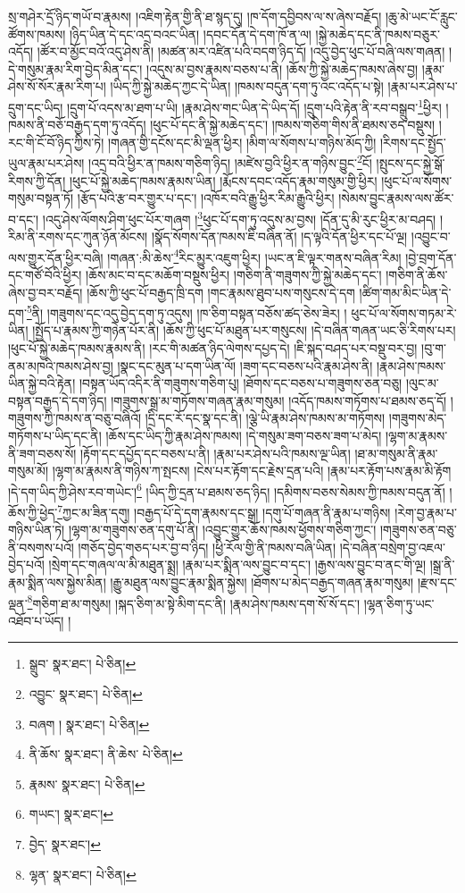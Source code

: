 སྲ་གཤེར་དྲོ་ཉིད་གཡོ་བ་རྣམས། །འཇིག་རྟེན་གྱི་ནི་ཐ་སྙད་དུ། །ཁ་དོག་དབྱིབས་ལ་ས་ཞེས་བརྗོད། །ཆུ་མེ་ཡང་ངོ་རླུང་ཚོགས་ཁམས། །ཉིད་ཡིན་དེ་དང་འདྲ་བའང་ཡིན། །དབང་དོན་དེ་དག་ཁོ་ན་ལ། །སྐྱེ་མཆེད་དང་ནི་ཁམས་བཅུར་འདོད། །ཚོར་བ་མྱོང་བའོ་འདུ་ཤེས་ནི། །མཚན་མར་འཛིན་པའི་བདག་ཉིད་དོ། །འདུ་བྱེད་ཕུང་པོ་བཞི་ལས་གཞན། །དེ་གསུམ་རྣམ་རིག་བྱེད་མིན་དང་། །འདུས་མ་བྱས་རྣམས་བཅས་པ་ནི། །ཆོས་ཀྱི་སྐྱེ་མཆེད་ཁམས་ཞེས་བྱ། །རྣམ་ཤེས་སོ་སོར་རྣམ་རིག་པ། །ཡིད་ཀྱི་སྐྱེ་མཆེད་ཀྱང་དེ་ཡིན། །ཁམས་བདུན་དག་ཏུ་འང་འདོད་པ་སྟེ། །རྣམ་པར་ཤེས་པ་དྲུག་དང་ཡིད། །དྲུག་པོ་འདས་མ་ཐག་པ་ཡི། །རྣམ་ཤེས་གང་ཡིན་དེ་ཡིད་དོ། །དྲུག་པའི་རྟེན་ནི་རབ་བསྒྲུབ་\footnote{སྒྲུབ་  སྣར་ཐང་།  པེ་ཅིན། }ཕྱིར། །ཁམས་ནི་བཅོ་བརྒྱད་དག་ཏུ་འདོད། །ཕུང་པོ་དང་ནི་སྐྱེ་མཆེད་དང་། །ཁམས་གཅིག་གིས་ནི་ཐམས་ཅད་བསྡུས། །རང་གི་ངོ་བོ་ཉིད་ཀྱིས་ཏེ། །གཞན་གྱི་དངོས་དང་མི་ལྡན་ཕྱིར། །མིག་ལ་སོགས་པ་གཉིས་མོད་ཀྱི། །རིགས་དང་སྤྱོད་ཡུལ་རྣམ་པར་ཤེས། །འདྲ་བའི་ཕྱིར་ན་ཁམས་གཅིག་ཉིད། །མཛེས་བྱའི་ཕྱིར་ན་གཉིས་བྱུང་\footnote{འབྱུང་  སྣར་ཐང་།  པེ་ཅིན། }ངོ། །སྤུངས་དང་སྐྱེ་སྒོ་རིགས་ཀྱི་དོན། །ཕུང་པོ་སྐྱེ་མཆེད་ཁམས་རྣམས་ཡིན། །རྨོངས་དབང་འདོད་རྣམ་གསུམ་གྱི་ཕྱིར། །ཕུང་པོ་ལ་སོགས་གསུམ་བསྟན་ཏོ། །རྩོད་པའི་རྩ་བར་གྱུར་པ་དང་། །འཁོར་བའི་རྒྱུ་ཕྱིར་རིམ་རྒྱུའི་ཕྱིར། །སེམས་བྱུང་རྣམས་ལས་ཚོར་བ་དང་། །འདུ་ཤེས་ལོགས་ཤིག་ཕུང་པོར་གཞག །\footnote{བཞག །  སྣར་ཐང་།  པེ་ཅིན། }ཕུང་པོ་དག་ཏུ་འདུས་མ་བྱས། །དོན་དུ་མི་རུང་ཕྱིར་མ་བཤད། །རིམ་ནི་རགས་དང་ཀུན་ཉོན་མོངས། །སྣོད་སོགས་དོན་ཁམས་ཇི་བཞིན་ནོ། །ད་ལྟའི་དོན་ཕྱིར་དང་པོ་ལྔ། །འབྱུང་བ་ལས་གྱུར་དོན་ཕྱིར་བཞི། །གཞན་:མི་ཆེས་\footnote{ནི་ཆོས་  སྣར་ཐང་། ནི་ཆེས་  པེ་ཅིན། }རིང་མྱུར་འཇུག་ཕྱིར། །ཡང་ན་ཇི་ལྟར་གནས་བཞིན་རིམ། །བྱེ་བྲག་དོན་དང་གཙོ་བོའི་ཕྱིར། །ཆོས་མང་བ་དང་མཆོག་བསྡུས་ཕྱིར། །གཅིག་ནི་གཟུགས་ཀྱི་སྐྱེ་མཆེད་དང་། །གཅིག་ནི་ཆོས་ཞེས་བྱ་བར་བརྗོད། །ཆོས་ཀྱི་ཕུང་པོ་བརྒྱད་ཁྲི་དག །གང་རྣམས་ཐུབ་པས་གསུངས་དེ་དག །ཚིག་གམ་མིང་ཡིན་དེ་དག་\footnote{རྣམས་  སྣར་ཐང་།  པེ་ཅིན། }ནི། །གཟུགས་དང་འདུ་བྱེད་དག་ཏུ་འདུས། །ཁ་ཅིག་བསྟན་བཅོས་ཚད་ཅེས་ཟེར། །
ཕུང་པོ་ལ་སོགས་གཏམ་རེ་ཡིན། །སྤྱོད་པ་རྣམས་ཀྱི་གཉེན་པོར་ནི། །ཆོས་ཀྱི་ཕུང་པོ་མཐུན་པར་གསུངས། །དེ་བཞིན་གཞན་ཡང་ཅི་རིགས་པར། །ཕུང་པོ་སྐྱེ་མཆེད་ཁམས་རྣམས་ནི། །རང་གི་མཚན་ཉིད་ལེགས་དཔྱད་དེ། །ཇི་སྐད་བཤད་པར་བསྡུ་བར་བྱ། །བུ་ག་ནམ་མཁའི་ཁམས་ཤེས་བྱ། །སྣང་དང་མུན་པ་དག་ཡིན་ལོ། །ཟག་དང་བཅས་པའི་རྣམ་ཤེས་ནི། །རྣམ་ཤེས་ཁམས་ཡིན་སྐྱེ་བའི་རྟེན། །བསྟན་ཡོད་འདིར་ནི་གཟུགས་གཅིག་པུ། །ཐོགས་དང་བཅས་པ་གཟུགས་ཅན་བཅུ། །ལུང་མ་བསྟན་བརྒྱད་དེ་དག་ཉིད། །གཟུགས་སྒྲ་མ་གཏོགས་གཞན་རྣམ་གསུམ། །འདོད་ཁམས་གཏོགས་པ་ཐམས་ཅད་དོ། །གཟུགས་ཀྱི་ཁམས་ན་བཅུ་བཞིའོ། །དྲི་དང་རོ་དང་སྣ་དང་ནི། །ལྕེ་ཡི་རྣམ་ཤེས་ཁམས་མ་གཏོགས། །གཟུགས་མེད་གཏོགས་པ་ཡིད་དང་ནི། །ཆོས་དང་ཡིད་ཀྱི་རྣམ་ཤེས་ཁམས། །དེ་གསུམ་ཟག་བཅས་ཟག་པ་མེད། །ལྷག་མ་རྣམས་ནི་ཟག་བཅས་སོ། །རྟོག་དང་དཔྱོད་དང་བཅས་པ་ནི། །རྣམ་པར་ཤེས་པའི་ཁམས་ལྔ་ཡིན། །ཐ་མ་གསུམ་ནི་རྣམ་གསུམ་མོ། །ལྷག་མ་རྣམས་ནི་གཉིས་ཀ་སྤངས། །ངེས་པར་རྟོག་དང་རྗེས་དྲན་པའི། །རྣམ་པར་རྟོག་པས་རྣམ་མི་རྟོག །དེ་དག་ཡིད་ཀྱི་ཤེས་རབ་གཡེང་།\footnote{གཡང་།  སྣར་ཐང་། } །ཡིད་ཀྱི་དྲན་པ་ཐམས་ཅད་ཉིད། །དམིགས་བཅས་སེམས་ཀྱི་ཁམས་བདུན་ནོ། །ཆོས་ཀྱི་ཕྱེད་\footnote{བྱེད་  སྣར་ཐང་། }ཀྱང་མ་ཟིན་དགུ། །བརྒྱད་པོ་དེ་དག་རྣམས་དང་སྒྲ། །དགུ་པོ་གཞན་ནི་རྣམ་པ་གཉིས། །རེག་བྱ་རྣམ་པ་གཉིས་ཡིན་ཏེ། །ལྷག་མ་གཟུགས་ཅན་དགུ་པོ་ནི། །འབྱུང་གྱུར་ཆོས་ཁམས་ཕྱོགས་གཅིག་ཀྱང་། །གཟུགས་ཅན་བཅུ་ནི་བསགས་པའོ། །གཅོད་བྱེད་གཅད་པར་བྱ་བ་ཉིད། །ཕྱི་རོལ་གྱི་ནི་ཁམས་བཞི་ཡིན། །དེ་བཞིན་བསྲེག་བྱ་འཇལ་བྱེད་པའོ། །སྲེག་དང་གཞལ་ལ་མི་མཐུན་སྨྲ། །རྣམ་པར་སྨིན་ལས་བྱུང་བ་དང་། །རྒྱས་ལས་བྱུང་བ་ནང་གི་ལྔ། །སྒྲ་ནི་རྣམ་སྨིན་ལས་སྐྱེས་མིན། །རྒྱུ་མཐུན་ལས་བྱུང་རྣམ་སྨིན་སྐྱེས། །ཐོགས་པ་མེད་བརྒྱད་གཞན་རྣམ་གསུམ། །རྫས་དང་ལྡན་\footnote{ལྷན་  སྣར་ཐང་།  པེ་ཅིན། }གཅིག་ཐ་མ་གསུམ། །སྐད་ཅིག་མ་སྟེ་མིག་དང་ནི། །རྣམ་ཤེས་ཁམས་དག་སོ་སོ་དང་། །ལྷན་ཅིག་ཏུ་ཡང་འཐོབ་པ་ཡོད། །
